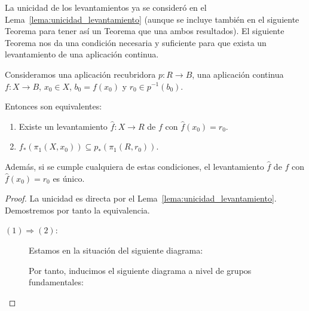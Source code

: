La unicidad de los levantamientos ya se consideró en el Lema~\ref{lema:unicidad_levantamiento} (aunque se incluye también en el siguiente Teorema para tener así un Teorema que una ambos resultados). El siguiente Teorema nos da una condición necesaria y suficiente para que exista un levantamiento de una aplicación continua.
\begin{teo}\label{teo:levantamiento_aplicaciones}
    Consideramos una aplicación recubridora $p:R\to B$, una aplicación continua $f:X\to B$, $x_0\in X$, $b_0=f(x_0)$ y $r_0\in p^{-1}(b_0)$. 
    \begin{center}
    \end{center}

    Entonces son equivalentes:
    \begin{enumerate}
        \item Existe un levantamiento $\hat{f}:X \to R$ de $f$ con $\hat{f}(x_0)=r_0$.
        \item $f_*(\pi_1(X,x_0))\subseteq p_*(\pi_1(R,r_0))$.
    \end{enumerate}
    Además, si se cumple cualquiera de estas condiciones, el levantamiento $\hat{f}$ de $f$ con $\hat{f}(x_0)=r_0$ es único.

    \begin{proof} La unicidad es directa por el Lema~\ref{lema:unicidad_levantamiento}. Demostremos por tanto la equivalencia.
        \begin{description}
            \item [$(1) \Longrightarrow (2)$:] Estamos en la situación del siguiente diagrama:
            \begin{center}
            \end{center}

            Por tanto, inducimos el siguiente diagrama a nivel de grupos fundamentales:
            \begin{center}
            \end{center}


\end{description}
\end{proof}
\end{teo}
